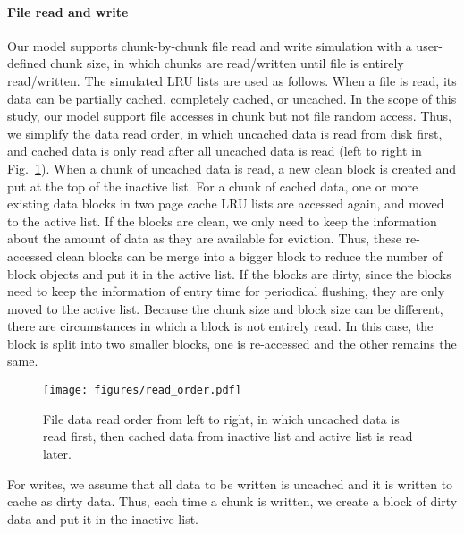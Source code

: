 \documentclass[conference]{IEEEtran}
\begin{document}
			\paragraph*{File read and write}
            Our model supports chunk-by-chunk file read and write simulation
            with a user-defined chunk size, in which chunks are read/written
            until file is entirely read/written.
            The simulated LRU lists are used as follows. 
            When a file is read, its data can be partially cached, completely cached, 
            or uncached. 
            In the scope of this study, our model support file accesses in chunk 
            but not file random access.
            Thus, we simplify the data read order, in which uncached data is read 
            from disk first, and cached data is only read after all uncached data is read 
            (left to right in Fig.~\ref{fig:read_order}).
            When a chunk of uncached data is read, a new clean block is created 
            and put at the top of the inactive list. 
            For a chunk of cached data, one or more existing data blocks in two 
            page cache LRU lists are accessed again, and moved to the active list. 
			If the blocks are clean, we only need to keep the information about the 
			amount of data as they are available for eviction. 
			Thus, these re-accessed clean blocks can be merge into a bigger block 
			to reduce the number of block objects and put it in the active list. 
            If the blocks are dirty, since the blocks need to keep the information 
            of entry time for periodical flushing, they are only moved to the active list. 
			Because the chunk size and block size can be different, there are circumstances 
			in which a block is not entirely read. 
			In this case, the block is split into two smaller blocks, one is re-accessed 
			and the other remains the same.
			
			\begin{figure}
   				\centering
   				\texttt{[image: figures/read\_order.pdf]}
   				\caption{File data read order from left to right, in which uncached data 
   				is read first, then cached data from inactive list and active list is read later.}	
   				\label{fig:read_order}
			\end{figure}	
			
			For writes, we assume that all data to be written is 
			uncached and it is written to cache as dirty data. 
			Thus, each time a chunk is written, we create a block of dirty data 
			and put it in the inactive list.		
			
\end{document}
